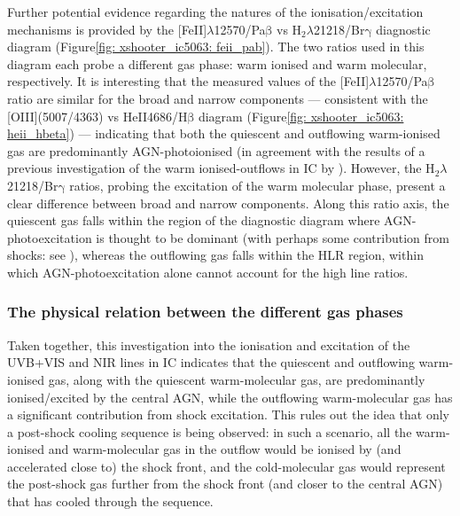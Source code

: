 Further potential evidence regarding the natures of the ionisation/excitation mechanisms is provided by the [FeII]$\lambda$12570/Pa$\mathrm{\beta}$ vs H$_2 \lambda$21218/Br$\mathrm{\gamma}$ diagnostic diagram (Figure\;\ref{fig: xshooter_ic5063: feii_pab}). The two ratios used in this diagram each probe a different gas phase: warm ionised and warm molecular, respectively. It is interesting that the measured values of the [FeII]$\lambda$12570/Pa$\mathrm{\beta}$ ratio are similar for the broad and narrow components --- consistent with the [OIII](5007/4363) vs HeII4686/H$\mathrm{\beta}$ diagram (Figure\;\ref{fig: xshooter_ic5063: heii_hbeta}) --- indicating that both the quiescent and outflowing warm-ionised gas are predominantly AGN-photoionised (in agreement with the results of a previous investigation of the warm ionised-outflows in IC by \citealt{Morganti2007}). However, the H$_2 \lambda$21218/Br$\mathrm{\gamma}$ ratios, probing the excitation of the warm molecular phase, present a clear difference between broad and narrow components. Along this ratio axis, the quiescent gas falls within the region of the diagnostic diagram where AGN-photoexcitation is thought to be dominant (with perhaps some contribution from shocks: see \citealt{Riffel2021}), whereas the outflowing gas falls within the HLR region, within which AGN-photoexcitation alone cannot account for the high line ratios.

\subsubsection{The physical relation between the different gas phases}
\label{section: xshooter_ic5063: discussion: mechanisms: physical_relation}

Taken together, this investigation into the ionisation and excitation of the UVB+VIS and NIR lines in IC indicates that the quiescent and outflowing warm-ionised gas, along with the quiescent warm-molecular gas, are predominantly ionised/excited by the central AGN, while the outflowing warm-molecular gas has a significant contribution from shock excitation. This rules out the idea that only a post-shock cooling sequence is being observed: in such a scenario, all the warm-ionised and warm-molecular gas in the outflow would be ionised by (and accelerated close to) the shock front, and the cold-molecular gas would represent the post-shock gas further from the shock front (and closer to the central AGN) that has cooled through the sequence.

